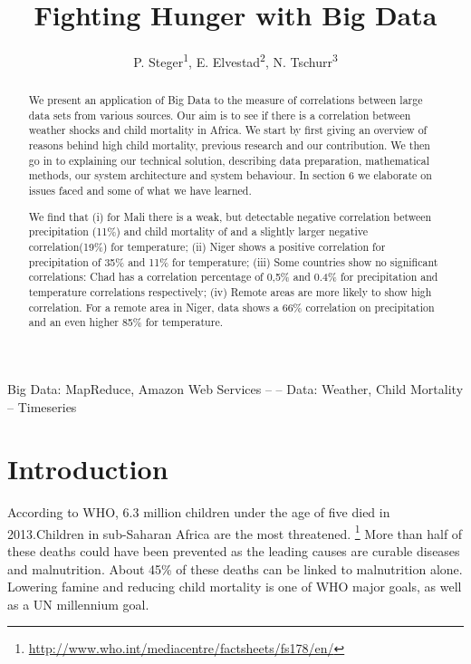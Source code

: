 \documentclass[
10pt, %
a4paper, %
oneside, %
headinclude,footinclude, %
useAMS,
usenatbib
]{template/mn2e}  %
\title{Fighting Hunger with Big Data} %
\author{P. Steger\textsuperscript{1}, E. Elvestad\textsuperscript{2}, N. Tschurr\textsuperscript{3}}
\date{} %
\begin{document}
\maketitle

\begin{abstract}
We present an application of Big Data to the measure of correlations between large data sets from various sources. Our aim is to see if there is a correlation between weather shocks and child mortality in Africa. We start by first giving an overview of reasons behind high child mortality, previous research and our contribution. We then go in to explaining our technical solution, describing data preparation, mathematical methods, our system architecture and system behaviour. In section 6 we elaborate on issues faced and some of what we have learned.

We find that (i) for Mali there is a weak, but detectable negative correlation between precipitation (11\%) and child mortality of and a slightly larger negative correlation(19\%) for temperature; (ii) Niger shows a positive correlation for precipitation of 35\% and 11\% for temperature; (iii) Some countries show no significant correlations: Chad has a correlation percentage of 0,5\% and 0.4\% for precipitation and temperature correlations respectively; (iv) Remote areas are more likely to show high correlation. For a remote area in Niger, data shows a 66\% correlation on precipitation and an even higher 85\% for temperature.

\end{abstract}

\begin{keywords} Big Data: MapReduce, Amazon Web Services --
    -- Data: Weather, Child Mortality -- Timeseries
\end{keywords}


\setcounter{tocdepth}{2}

{\let\thefootnote\relax{}}
{\let\thefootnote\relax{}}
{\let\thefootnote\relax{}}



\section{Introduction}
According to WHO, 6.3 million children under the age of five died in 2013.Children in sub-Saharan Africa are the most threatened. \footnote{\url{http://www.who.int/mediacentre/factsheets/fs178/en/}} More than half of these deaths could have been prevented as the leading causes are curable diseases and malnutrition. About 45\% of these deaths can be linked to malnutrition alone.  Lowering famine and reducing child mortality is one of WHO major goals, as well as a UN millennium goal.
\end{document}

